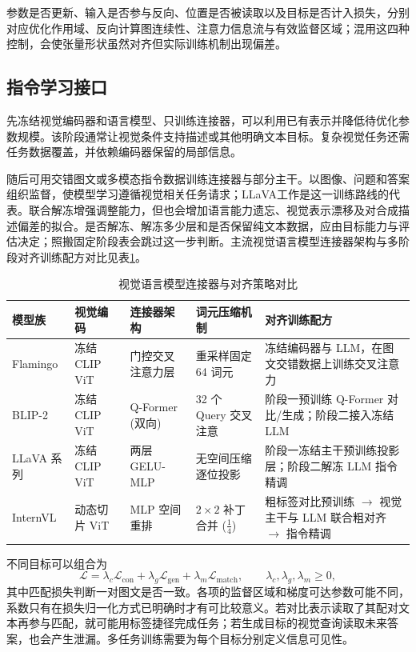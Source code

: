 \documentclass[../textbook.tex]{subfiles}
\begin{document}
\begin{warning}
参数是否更新、输入是否参与反向、位置是否被读取以及目标是否计入损失，分别对应优化作用域、反向计算图连续性、注意力信息流与有效监督区域；混用这四种控制，会使张量形状虽然对齐但实际训练机制出现偏差。
\end{warning}

\subsection{指令学习接口}
先冻结视觉编码器和语言模型、只训练连接器，可以利用已有表示并降低待优化参数规模。该阶段通常让视觉条件支持描述或其他明确文本目标。复杂视觉任务还需任务数据覆盖，并依赖编码器保留的局部信息。

随后可用交错图文或多模态指令数据训练连接器与部分主干。以图像、问题和答案组织监督，使模型学习遵循视觉相关任务请求；LLaVA工作是这一训练路线的代表\cite{liu2023visualinstruction}。联合解冻增强调整能力，但也会增加语言能力遗忘、视觉表示漂移及对合成描述偏差的拟合。是否解冻、解冻多少层和是否保留纯文本数据，应由目标能力与评估决定；照搬固定阶段表会跳过这一步判断。主流视觉语言模型连接器架构与多阶段对齐训练配方对比见表\ref{tab:vlm-connectors}。

\begin{table}[htbp]
\centering
\small
\setlength{\tabcolsep}{3pt}
\caption{视觉语言模型连接器与对齐策略对比}\label{tab:vlm-connectors}
\begin{tabularx}{\linewidth}{@{}p{1.5cm}p{2.2cm}p{2.2cm}p{2.2cm}X@{}}
\toprule
模型族 & 视觉编码 & 连接器架构 & 词元压缩机制 & 对齐训练配方 \\
\midrule
Flamingo & 冻结 CLIP ViT & 门控交叉注意力层 & 重采样固定 64 词元 & 冻结编码器与 LLM，在图文交错数据上训练交叉注意力 \\
BLIP-2 & 冻结 CLIP ViT & Q-Former (双向) & 32 个 Query 交叉注意 & 阶段一预训练 Q-Former 对比/生成；阶段二接入冻结 LLM \\
LLaVA 系列 & 冻结 CLIP ViT & 两层 GELU-MLP & 无空间压缩逐位投影 & 阶段一冻结主干预训练投影层；阶段二解冻 LLM 指令精调 \\
InternVL & 动态切片 ViT & MLP 空间重排 & $2\times2$ 补丁合并 ($\frac{1}{4}$) & 粗标签对比预训练 $\to$ 视觉主干与 LLM 联合粗对齐 $\to$ 指令精调 \\
\bottomrule
\end{tabularx}
\end{table}

不同目标可以组合为
\begin{equation}
 \mathcal L=\lambda_c\mathcal L_{\mathrm{con}}+
 \lambda_g\mathcal L_{\mathrm{gen}}+
 \lambda_m\mathcal L_{\mathrm{match}},\qquad \lambda_c,\lambda_g,\lambda_m\ge0,
\end{equation}
其中匹配损失判断一对图文是否一致。各项的监督区域和梯度可达参数可能不同，系数只有在损失归一化方式已明确时才有可比较意义。若对比表示读取了其配对文本再参与匹配，就可能用标签捷径完成任务；若生成目标的视觉查询读取未来答案，也会产生泄漏。多任务训练需要为每个目标分别定义信息可见性。
\end{document}
